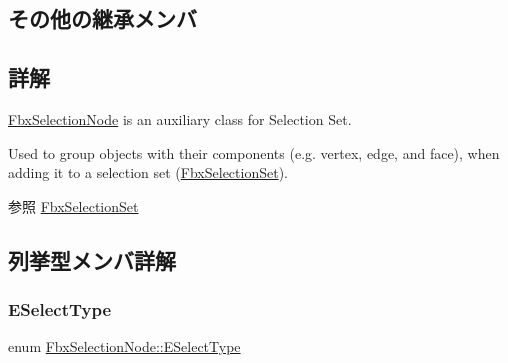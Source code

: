 \subsection*{その他の継承メンバ}


\subsection{詳解}
\hyperlink{class_fbx_selection_node}{Fbx\+Selection\+Node} is an auxiliary class for Selection Set.

Used to group objects with their components (e.\+g. vertex, edge, and face), when adding it to a selection set (\hyperlink{class_fbx_selection_set}{Fbx\+Selection\+Set}). \begin{DoxySeeAlso}{参照}
\hyperlink{class_fbx_selection_set}{Fbx\+Selection\+Set} 
\end{DoxySeeAlso}


\subsection{列挙型メンバ詳解}
\mbox{\label{class_fbx_selection_node_aa24cf47b60ff436a1cce9409da37e78f}} 
\subsubsection{\texorpdfstring{E\+Select\+Type}{ESelectType}}
{\footnotesize\ttfamily enum \hyperlink{class_fbx_selection_node_aa24cf47b60ff436a1cce9409da37e78f}{Fbx\+Selection\+Node\+::\+E\+Select\+Type}}

